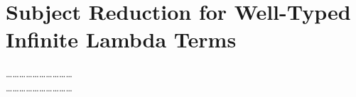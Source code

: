 
\section{Subject Reduction for Well-Typed Infinite Lambda Terms}
\label{section-subject-reduction}
\ldots\ldots\ldots\ldots\ldots\ldots\ldots\ldots\ldots\ldots
\\
\ldots\ldots\ldots\ldots\ldots\ldots\ldots\ldots\ldots\ldots

